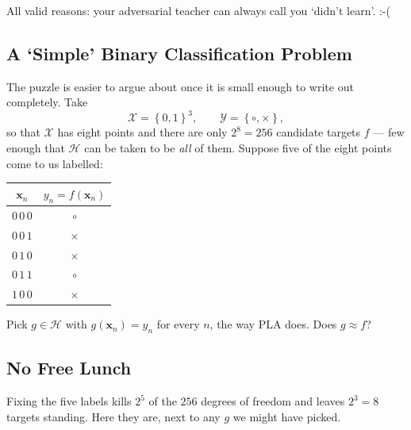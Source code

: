 \begin{moral}
    All valid reasons: your adversarial teacher can always call you `didn't
    learn'. :-(
\end{moral}

\subsection{A `Simple' Binary Classification Problem}

The puzzle is easier to argue about once it is small enough to write out
completely. Take
\[
    \mathcal{X} = \left\{ 0, 1 \right\}^3 , \qquad
    \mathcal{Y} = \left\{ \circ, \times \right\} ,
\]
so that \(\mathcal{X}\) has eight points and there are only \(2^8 = 256\)
candidate targets \(f\) --- few enough that \(\mathcal{H}\) can be taken to be
\emph{all} of them. Suppose five of the eight points come to us labelled:

\begin{center}
    \begin{tabular}{@{}c|c@{}}
        \toprule
        \(\bm{x}_n\) & \(y_n = f(\bm{x}_n)\)\\
        \midrule
        \(0\,0\,0\) & \(\circ\)\\
        \(0\,0\,1\) & \(\times\)\\
        \(0\,1\,0\) & \(\times\)\\
        \(0\,1\,1\) & \(\circ\)\\
        \(1\,0\,0\) & \(\times\)\\
        \bottomrule
    \end{tabular}
\end{center}

\begin{question}
    Pick \(g \in \mathcal{H}\) with \(g(\bm{x}_n) = y_n\) for every \(n\), the
    way PLA does. Does \(g \approx f\)?
\end{question}

\subsection{No Free Lunch}

Fixing the five labels kills \(2^5\) of the \(256\) degrees of freedom and
leaves \(2^3 = 8\) targets standing. Here they are, next to any \(g\) we might
have picked.

